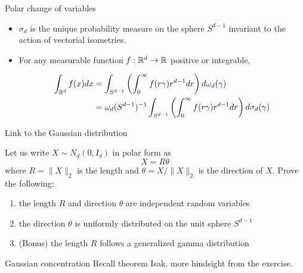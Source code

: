 \documentclass{beamer}
\begin{document}
  \begin{frame}{Polar change of variables}
    \begin{theorem}
      \begin{itemize}
      \item $\sigma_{d}$ is the unique probability measure on the sphere
        $S^{d-1}$ invariant to the action of vectorial isometries.

        \pause

      \item For any measurable function $f: \mathbb{R}^{d} \to \mathbb{R}$ positive or integrable,

        \begin{equation*}
          \begin{aligned}
            \int_{\mathbb{R}^{d}} f(x) d x &=\int_{S^{d-1}}\left(\int_{0}^{\infty} f(r \gamma) r^{d-1} d r\right) d \textcolor{blue}{\omega_d}(\gamma) \\  &= \omega_d(S^{d-1})^{-1} \int_{S^{d-1}}\left(\int_{0}^{\infty} f(r \gamma) r^{d-1} d r\right) d \sigma_d(\gamma)
          \end{aligned}
        \end{equation*}


      \end{itemize}

    \end{theorem}

  \end{frame}

  \begin{frame}{Link to the Gaussian distribution}
    \begin{proposition}[Exercise 3.3.7] Let us write $X \sim N_d\left(0, I_{d}\right)$ in
      polar  form as
      $$
      X=R \theta
      $$
      where $R=\|X\|_{2}$ is the length and $\theta=X /\|X\|_{2}$ is the direction
      of $X$. Prove the following:

      \begin{enumerate}
      \item the length $R$ and direction $\theta$ are independent random variables
      \item the direction $\theta$ is uniformly distributed on the unit sphere
        $S^{d-1}$
      \item (Bonus) the length $R$ follows a generalized gamma distribution
      \end{enumerate}
    \end{proposition}

  \end{frame}

  \begin{frame}{Gaussian concentration}
  Recall theorem Isak, more hindsight from the exercise.
  \end{frame}
\end{document}
